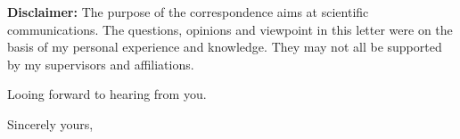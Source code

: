 \documentclass[]{letter}
\begin{document}
\begin{letter}
\textbf{Disclaimer:} The purpose of the correspondence aims at scientific communications. The questions, opinions and viewpoint in this letter were on the basis of my personal experience and knowledge. They may not all be supported by my supervisors and affiliations.

Looing forward to hearing from you.




\signature{Tu Hu}

\closing{Sincerely yours,}

\printbibliography
\end{letter}
\end{document}
